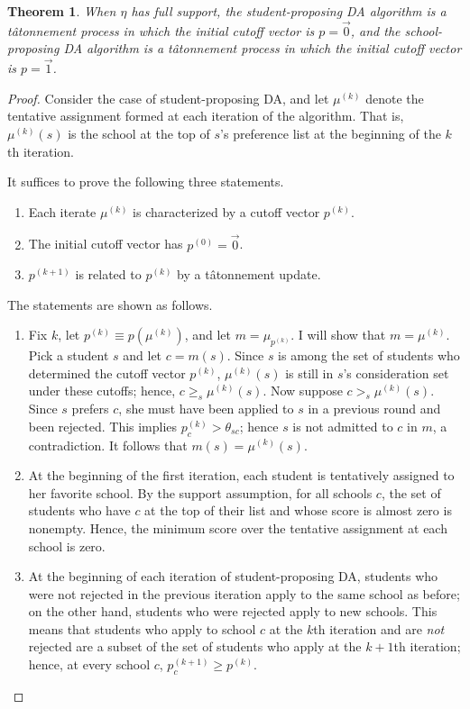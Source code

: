 \documentclass[12pt]{article}
\newtheorem{theorem}{Theorem}
\theoremstyle{definition}
\begin{document}
\begin{theorem}When $\eta$ has full support, the student-proposing DA algorithm is a t\^{a}tonnement process in which the initial cutoff vector is $p = \vec 0$, and the school-proposing DA algorithm is a t\^{a}tonnement process in which the initial cutoff vector is $p = \vec 1$. \end{theorem}
\begin{proof}
Consider the case of student-proposing DA, and let $\mu^{(k)}$ denote the tentative assignment formed at each iteration of the algorithm. That is, $\mu^{(k)}(s)$ is the school at the top of $s$’s preference list at the beginning of the $k$th iteration.

It suffices to prove the following three statements.
\begin{enumerate}
\item Each iterate $\mu^{(k)}$ is characterized by a cutoff vector $p^{(k)}$.
\item The initial cutoff vector has $p^{(0)} = \vec 0$.
\item $p^{(k+1)}$ is related to $p^{(k)}$ by a t\^{a}tonnement update.
\end{enumerate}
The statements are shown as follows. 
\begin{enumerate}
\item Fix $k$, let $p^{(k)} \equiv p\left(\mu^{(k)}\right)$, and let $m = \mu_{p^{(k)}}$. I will show that $m = \mu^{(k)}$. Pick a student $s$ and let $c = m(s)$. Since $s$ is among the set of students who determined the cutoff vector $p^{(k)}$, $ \mu^{(k)}(s)$ is still in $s$’s consideration set under these cutoffs; hence,  $c \geq_s \mu^{(k)}(s)$.  Now suppose $c >_s \mu^{(k)}(s)$. Since $s$ prefers $c$, she must have been applied to $s$ in a previous round and been rejected. This implies $p^{(k)}_{c} > \theta_{sc}$; hence $s$ is not admitted to $c$ in $m$, a contradiction. It follows that $m(s) = \mu^{(k)}(s)$. 

\item At the beginning of the first iteration, each student is tentatively assigned to her favorite school. By the support assumption, for all schools $c$, the set of students who have $c$ at the top of their list and whose score is almost zero is nonempty. Hence, the minimum score over the tentative assignment at each school is zero.

\item At the beginning of each iteration of student-proposing DA, students who were not rejected in the previous iteration apply to the same school as before; on the other hand, students who were rejected apply to new schools. This means that students who apply to school $c$ at the $k$th iteration and are \emph{not} rejected are a subset of the set of students who apply at the $k+1$th iteration; hence, at every school $c$, $p_c^{(k+1)} \geq p^{(k)}$.


\end{enumerate}
\end{proof}
\end{document}
